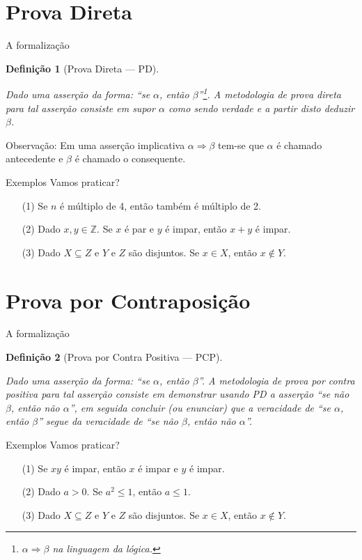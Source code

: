 \documentclass[aspectratio=169]{beamer}
\newtheorem{defi}{Definição}
\begin{document}
	\section{Prova Direta}
	
	\begin{frame}{A formalização}
		\begin{defi}[Prova Direta --- PD]
			\
			
			Dado uma asserção da forma: ``se $\alpha$, então $\beta$''\footnote{$\alpha \Rightarrow \beta$ na linguagem da lógica.}. A metodologia de prova direta para tal asserção consiste em supor $\alpha$ como sendo verdade e a partir disto deduzir $\beta$.
		\end{defi}
		\pause
		\begin{alertblock}{Observação:}
			Em uma asserção implicativa $\alpha \Rightarrow \beta$ tem-se que $\alpha$ é chamado antecedente e $\beta$ é chamado o consequente.
		\end{alertblock}
	\end{frame}

	\begin{frame}{Exemplos}
		Vamos praticar?
		\begin{itemize}
			\item[(1)]  Se $n$ é múltiplo de 4, então também é múltiplo de 2.
			\item[(2)] Dado $x, y \in \mathbb{Z}$. Se $x$ é par e $y$  é impar, então $x + y$ é impar.
			\item[(3)] Dado $X \subseteq Z$ e $Y$ e $Z$ são disjuntos. Se $x \in X$, então $x \notin Y$.
		\end{itemize}
	\end{frame}
	
	\section{Prova por Contraposição}
	
	\begin{frame}{A formalização}
		\begin{defi}[Prova por Contra Positiva --- PCP]
			\
			
			Dado uma asserção da forma: ``se $\alpha$, então $\beta$''. A metodologia de prova por contra positiva para tal asserção consiste em demonstrar usando PD a asserção ``se não $\beta$, então não $\alpha$'', em seguida concluir (ou enunciar) que a veracidade de ``se $\alpha$, então $\beta$'' segue da veracidade de ``se não $\beta$, então não $\alpha$''.
		\end{defi}
	\end{frame}

	\begin{frame}{Exemplos}
		Vamos praticar?
		\begin{itemize}
			\item[(1)]  Se $xy$ é impar, então $x$ é impar e $y$ é impar.
			\item[(2)] Dado $a > 0$. Se $a^2 \leq 1$, então $a \leq 1$.
			\item[(3)] Dado $X \subseteq Z$ e $Y$ e $Z$ são disjuntos. Se $x \in X$, então $x \notin Y$.
		\end{itemize}
	\end{frame}
\end{document}
